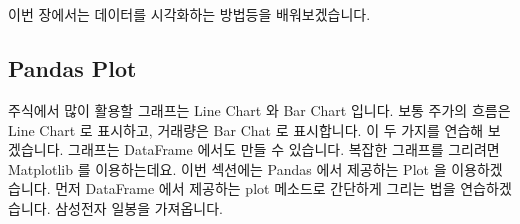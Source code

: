 \documentclass[letterpaper,10pt,english]{jupyterBook}
\begin{document}
\chapter{}
\label{\detokenize{chapter2/2.3.0_Visualization:id1}}\label{\detokenize{chapter2/2.3.0_Visualization::doc}}
\sphinxAtStartPar
이번 장에서는 데이터를 시각화하는 방법등을 배워보겠습니다.


\section{Pandas Plot}
\label{\detokenize{chapter2/2.3.1_Visualization:pandas-plot}}\label{\detokenize{chapter2/2.3.1_Visualization::doc}}
\sphinxAtStartPar
주식에서 많이 활용할 그래프는 Line Chart 와 Bar Chart 입니다. 보통 주가의 흐름은 Line Chart 로 표시하고, 거래량은 Bar Chat 로 표시합니다. 이 두 가지를 연습해 보겠습니다. 그래프는 DataFrame 에서도 만들 수 있습니다. 복잡한 그래프를 그리려면 Matplotlib 를 이용하는데요. 이번 섹션에는 Pandas 에서 제공하는 Plot 을 이용하겠습니다. 먼저 DataFrame 에서 제공하는 plot 메소드로 간단하게 그리는 법을 연습하겠습니다. 삼성전자 일봉을 가져옵니다.
\end{document}
